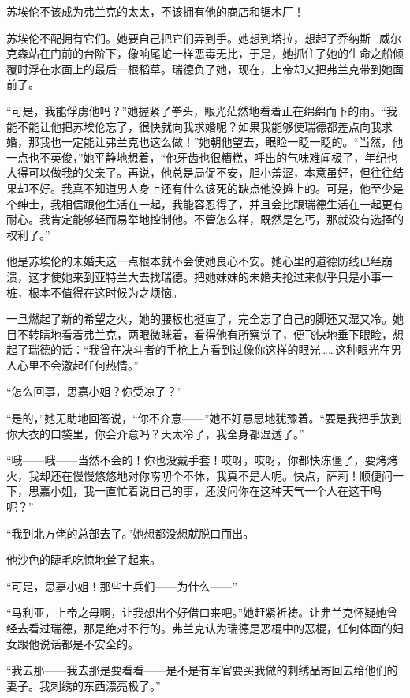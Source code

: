 \par 苏埃伦不该成为弗兰克的太太，不该拥有他的商店和锯木厂！
\par 苏埃伦不配拥有它们。她要自己把它们弄到手。她想到塔拉，想起了乔纳斯·威尔克森站在门前的台阶下，像响尾蛇一样恶毒无比，于是，她抓住了她的生命之船倾覆时浮在水面上的最后一根稻草。瑞德负了她，现在，上帝却又把弗兰克带到她面前了。
\par “可是，我能俘虏他吗？”她握紧了拳头，眼光茫然地看着正在绵绵而下的雨。“我能不能让他把苏埃伦忘了，很快就向我求婚呢？如果我能够使瑞德都差点向我求婚，那我也一定能让弗兰克也这么做！”她朝他望去，眼睑一眨一眨的。“当然，他一点也不英俊，”她平静地想着，“他牙齿也很糟糕，呼出的气味难闻极了，年纪也大得可以做我的父亲了。再说，他总是局促不安，胆小羞涩，本意虽好，但往往结果却不好。我真不知道男人身上还有什么该死的缺点他没摊上的。可是，他至少是个绅士，我相信跟他生活在一起，我能容忍得了，并且会比跟瑞德生活在一起更有耐心。我肯定能够轻而易举地控制他。不管怎么样，既然是乞丐，那就没有选择的权利了。”
\par 他是苏埃伦的未婚夫这一点根本就不会使她良心不安。她心里的道德防线已经崩溃，这才使她来到亚特兰大去找瑞德。把她妹妹的未婚夫抢过来似乎只是小事一桩，根本不值得在这时候为之烦恼。
\par 一旦燃起了新的希望之火，她的腰板也挺直了，完全忘了自己的脚还又湿又冷。她目不转睛地看着弗兰克，两眼微眯着，看得他有所察觉了，便飞快地垂下眼睑，想起了瑞德的话：“我曾在决斗者的手枪上方看到过像你这样的眼光……这种眼光在男人心里不会激起任何热情。”
\par “怎么回事，思嘉小姐？你受凉了？”
\par “是的，”她无助地回答说，“你不介意——”她不好意思地犹豫着。“要是我把手放到你大衣的口袋里，你会介意吗？天太冷了，我全身都湿透了。”
\par “哦——哦——当然不会的！你也没戴手套！哎呀，哎呀，你都快冻僵了，要烤烤火，我却还在慢慢悠悠地对你唠叨个不休，我真不是人呢。快点，萨莉！顺便问一下，思嘉小姐，我一直忙着说自己的事，还没问你在这种天气一个人在这干吗呢？”
\par “我到北方佬的总部去了。”她想都没想就脱口而出。
\par 他沙色的睫毛吃惊地耸了起来。
\par “可是，思嘉小姐！那些士兵们——为什么——”
\par “马利亚，上帝之母啊，让我想出个好借口来吧。”她赶紧祈祷。让弗兰克怀疑她曾经去看过瑞德，那是绝对不行的。弗兰克认为瑞德是恶棍中的恶棍，任何体面的妇女跟他说话都是不安全的。
\par “我去那——我去那是要看看——是不是有军官要买我做的刺绣品寄回去给他们的妻子。我刺绣的东西漂亮极了。”
